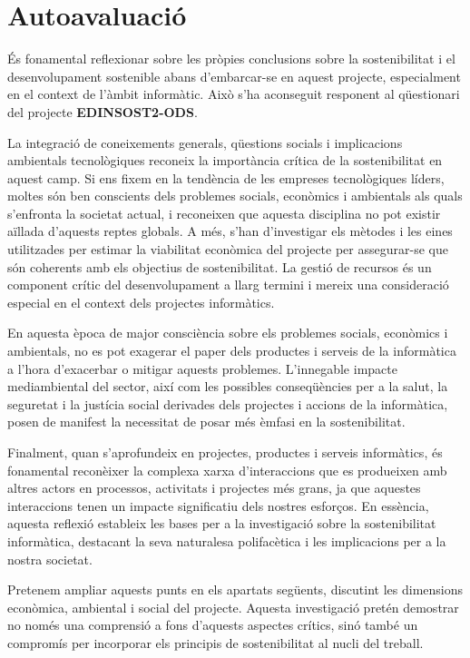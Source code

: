 \section{Autoavaluació}
És fonamental reflexionar sobre les pròpies conclusions sobre la sostenibilitat i el desenvolupament sostenible abans d'embarcar-se en aquest projecte, especialment en el context de l'àmbit informàtic. Això s'ha aconseguit responent al qüestionari del projecte \textbf{EDINSOST2-ODS}.

La integració de coneixements generals, qüestions socials i implicacions ambientals tecnològiques reconeix la importància crítica de la sostenibilitat en aquest camp. Si ens fixem en la tendència de les empreses tecnològiques líders, moltes són ben conscients dels problemes socials, econòmics i ambientals als quals s'enfronta la societat actual, i reconeixen que aquesta disciplina no pot existir aïllada d'aquests reptes globals. A més, s'han d'investigar els mètodes i les eines utilitzades per estimar la viabilitat econòmica del projecte per assegurar-se que són coherents amb els objectius de sostenibilitat. La gestió de recursos és un component crític del desenvolupament a llarg termini i mereix una consideració especial en el context dels projectes informàtics.

En aquesta època de major consciència sobre els problemes socials, econòmics i ambientals, no es pot exagerar el paper dels productes i serveis de la informàtica a l'hora d'exacerbar o mitigar aquests problemes. L'innegable impacte mediambiental del sector, així com les possibles conseqüències per a la salut, la seguretat i la justícia social derivades dels projectes i accions de la informàtica, posen de manifest la necessitat de posar més èmfasi en la sostenibilitat.

Finalment, quan s'aprofundeix en projectes, productes i serveis informàtics, és fonamental reconèixer la complexa xarxa d'interaccions que es produeixen amb altres actors en processos, activitats i projectes més grans, ja que aquestes interaccions tenen un impacte significatiu dels nostres esforços. En essència, aquesta reflexió estableix les bases per a la investigació sobre la sostenibilitat informàtica, destacant la seva naturalesa polifacètica i les implicacions per a la nostra societat.

Pretenem ampliar aquests punts en els apartats següents, discutint les dimensions econòmica, ambiental i social del projecte. Aquesta investigació pretén demostrar no només una comprensió a fons d'aquests aspectes crítics, sinó també un compromís per incorporar els principis de sostenibilitat al nucli del treball.
